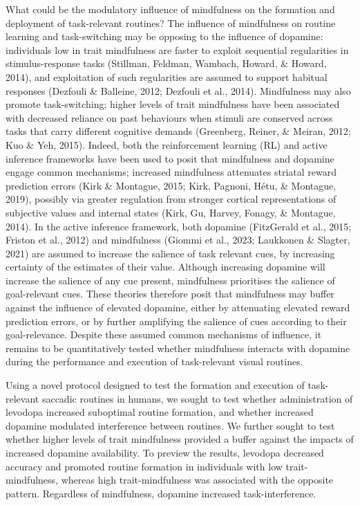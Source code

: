 \documentclass[
  man]{apa6}
\begin{document}
What could be the modulatory influence of mindfulness on the formation and deployment of task-relevant routines? The influence of mindfulness on routine learning and task-switching may be opposing to the influence of dopamine: individuals low in trait mindfulness are faster to exploit sequential regularities in stimulus-response tasks (Stillman, Feldman, Wambach, Howard, \& Howard, 2014), and exploitation of such regularities are assumed to support habitual responses (Dezfouli \& Balleine, 2012; Dezfouli et al., 2014). Mindfulness may also promote task-switching; higher levels of trait mindfulness have been associated with decreased reliance on past behaviours when stimuli are conserved across tasks that carry different cognitive demands (Greenberg, Reiner, \& Meiran, 2012; Kuo \& Yeh, 2015). Indeed, both the reinforcement learning (RL) and active inference frameworks have been used to posit that mindfulness and dopamine engage common mechanisms; increased mindfulness attenuates striatal reward prediction errors (Kirk \& Montague, 2015; Kirk, Pagnoni, Hétu, \& Montague, 2019), possibly via greater regulation from stronger cortical
representations of subjective values and internal states (Kirk, Gu, Harvey, Fonagy, \& Montague, 2014). In the active inference framework, both dopamine (FitzGerald et al., 2015; Friston et al., 2012) and mindfulness (Giommi et al., 2023; Laukkonen \& Slagter, 2021) are assumed to increase the salience of task relevant cues, by increasing certainty of the estimates of their value. Although increasing dopamine will increase the salience of any cue present, mindfulness prioritises the salience of goal-relevant cues. These theories therefore posit that mindfulness may buffer against the influence of elevated dopamine, either by attenuating elevated reward prediction errors, or by further amplifying the salience of cues according to their goal-relevance. Despite these assumed common mechanisms of influence, it remains to be quantitatively tested whether mindfulness interacts with dopamine during the performance and execution of task-relevant visual routines.

Using a novel protocol designed to test the formation and execution of task-relevant saccadic routines in humans, we sought to test whether administration of levodopa increased suboptimal routine formation, and whether increased dopamine modulated interference between routines. We further sought to test whether higher levels of trait mindfulness provided a buffer against the impacts of increased dopamine availability. To preview the results, levodopa decreased accuracy and promoted routine formation in individuals with low trait-mindfulness, whereas high trait-mindfulness was associated with the opposite pattern. Regardless of mindfulness, dopamine increased task-interference.
\end{document}
